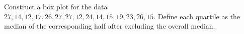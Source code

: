 Construct a box plot for the data $27,14,12,17,26,27,27,12,24,14,15,19,23,26,15$. Define each quartile as the median of the corresponding half after excluding the overall median.
